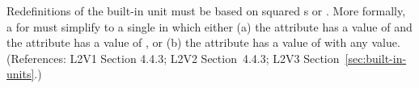 Redefinitions of the built-in unit  must be based on squared
s or .  More formally, a \UnitDefinition
for  must simplify to a single \Unit in which either (a) the
 attribute has a value of  and the
 attribute has a value of , or (b) the
 attribute has a value of  with
any  value.  (References: L2V1 Section 4.4.3; L2V2
Section~4.4.3; L2V3 Section~\ref{sec:built-in-units}.)
